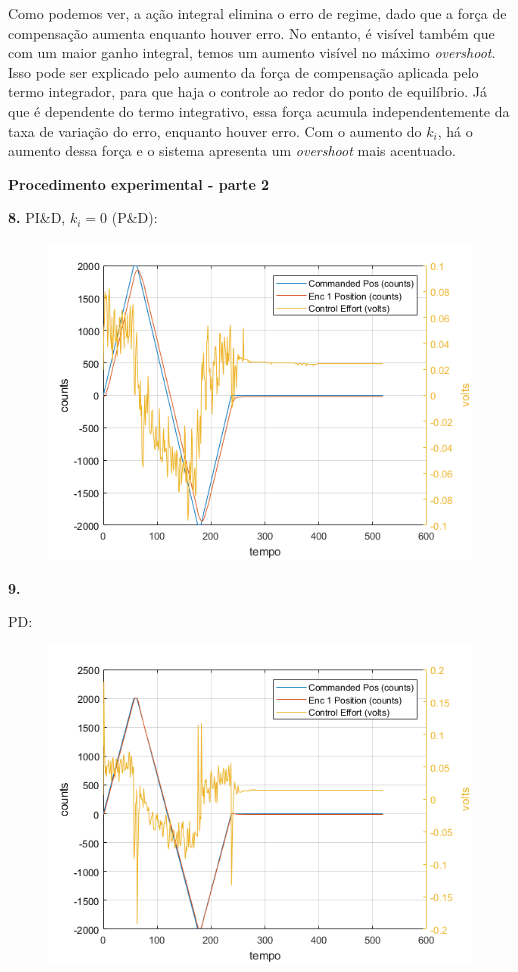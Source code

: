 \documentclass[a4paper,11pt]{article}
\begin{document}
Como podemos ver, a ação integral elimina o erro de regime, dado que a força de
compensação aumenta enquanto houver erro. No entanto, é visível também que com
um maior ganho integral, temos um aumento visível no máximo \textit{overshoot}.
Isso pode ser explicado pelo aumento da força de compensação aplicada pelo termo
integrador, para que haja o controle ao redor do ponto de equilíbrio. Já que é
dependente do termo integrativo, essa força acumula independentemente da taxa de
variação do erro, enquanto houver erro. Com o aumento do $k_i$, há o aumento
dessa força e o sistema apresenta um \textit{overshoot} mais acentuado. \\

\pagebreak

\textbf{Procedimento experimental - parte 2}

\textbf{8.}
PI\&D, $k_i = 0$ (P\&D):

\begin{figure}[H]
\includegraphics{q08}
\centering
\end{figure}

\textbf{9.}

PD:

\begin{figure}[H]
\includegraphics{q09-pd}
\centering
\end{figure}
\end{document}
